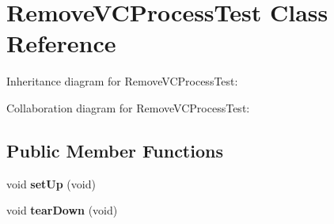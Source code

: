 \hypertarget{class_remove_v_c_process_test}{\section{Remove\+V\+C\+Process\+Test Class Reference}
\label{class_remove_v_c_process_test}
}


Inheritance diagram for Remove\+V\+C\+Process\+Test\+:


Collaboration diagram for Remove\+V\+C\+Process\+Test\+:
\subsection*{Public Member Functions}
\begin{DoxyCompactItemize}
\item 
\hypertarget{class_remove_v_c_process_test_a430a8600063b353f74aa7a1238565d4f}{void {\bfseries set\+Up} (void)}\label{class_remove_v_c_process_test_a430a8600063b353f74aa7a1238565d4f}

\item 
\hypertarget{class_remove_v_c_process_test_a87499523ef68675efdca437aaff42060}{void {\bfseries tear\+Down} (void)}\label{class_remove_v_c_process_test_a87499523ef68675efdca437aaff42060}

\end{DoxyCompactItemize}
